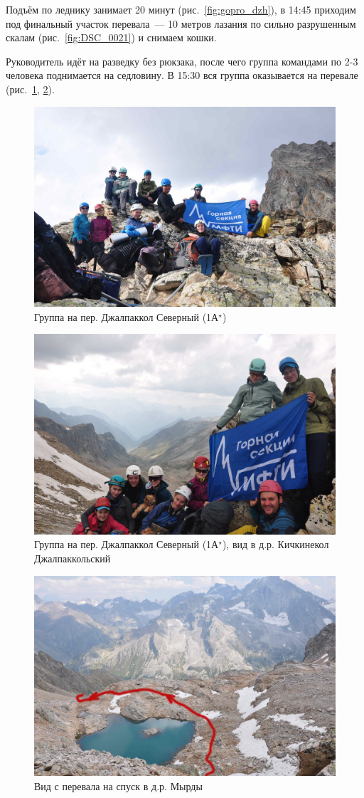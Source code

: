 Подъём по леднику занимает 20 минут (рис.~\ref{fig:gopro_dzh}), в 14:45 приходим под финальный участок перевала~--- 10 метров лазания по сильно разрушенным скалам (рис.~\ref{fig:DSC_0021}) и снимаем кошки.

Руководитель идёт на разведку без рюкзака, после чего группа командами по 2-3 человека поднимается на седловину. В 15:30 вся группа оказывается на перевале (рис.~\ref{fig:DSC_0063}, \ref{fig:DSC_0069}).

\begin{figure}[h!]	
	\centering
	\includegraphics[angle=0, width=0.7\linewidth]{../pics/DSC_0063}
	\caption{Группа на пер. Джалпаккол Северный (1А$^\star$)}
	\label{fig:DSC_0063}
\end{figure}

\begin{figure}[h!]	
	\centering
	\includegraphics[angle=0, width=0.7\linewidth]{../pics/DSC_0069}
	\caption{Группа на пер. Джалпаккол Северный (1А$^\star$), вид в д.р. Кичкинекол Джалпаккольский}
	\label{fig:DSC_0069}
\end{figure}

\begin{figure}[h!]	
	\centering
	\includegraphics[angle=0, width=0.7\linewidth]{../pics/DSC_0041}
	\caption{Вид с перевала на спуск в д.р. Мырды}
	\label{fig:DSC_0041}
\end{figure}

